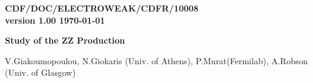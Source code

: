 \documentclass[12pt]{article}
\begin{document}
\newcommand {\plots} {/home/murat/drs4/figures}


\begin{titlepage}

  \begin{flushright}
    \bf CDF/DOC/ELECTROWEAK/CDFR/10008 \\
    version 1.00
    \today
  \end{flushright}
  
  \vspace{1cm}
  
  \begin{center} {
      \Large \bf
      Study of the ZZ Production
    }

    \vspace{1cm}

    { 
      V.Giakoumopoulou, N.Giokaris (Univ. of Athens), P.Murat(Fermilab), 
      A.Robson (Univ. of Glasgow) 
    }

 \end{center}

  \vspace{1cm}

  \begin{abstract}
    Using 4.8\invfb\ of data collected by the CDF experiment in \ppbar\ collisions 
    at 1.96 TeV we study production of events with two Z bosons. 

    We analyse Z($l^+l^-$)Z($l^+l^-$), Z($l^+l^-$)Z($\nu\nu$) and Z($l^+l^-$)Z(jj) 
    final states in search for narrow resonances.

    Analysis of the Z($l^+l^-$)Z($l^+l^-$) channel uses data reconstructed with GEN7.
    Z($l^+l^-$)Z($\nu\nu$) and Z($l^+l^-$)Z(jj) channels are analysed using GEN6 data.

    Production cross section of the ZZ pairs measured in the region $M_{ZZ}<300$ GeV 
    is consistent with the SM expectations.
  \end{abstract}

\end{titlepage} 

{\tableofcontents}
\end{document}
